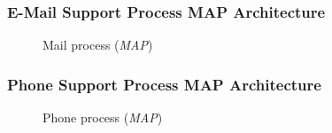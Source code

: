 \subsubsection{E-Mail Support Process MAP Architecture}
\label{sec:mail_map}
\begin{center}
	\begin{figure}[H]
		\centering
		\setlength\fboxsep{7pt}
		\setlength\fboxrule{0.5pt}
		\caption{Mail process (\emph{MAP})}
		\label{fig:map_mail}
	\end{figure}
\end{center}
%
\subsubsection{Phone Support Process MAP Architecture}
\label{sec:phone_map}
\begin{center}
	\begin{figure}[H]
		\centering
		\setlength\fboxsep{7pt}
		\setlength\fboxrule{0.5pt}
		\caption{Phone process (\emph{MAP})}
		\label{fig:map_phone}
	\end{figure}
\end{center}
%
